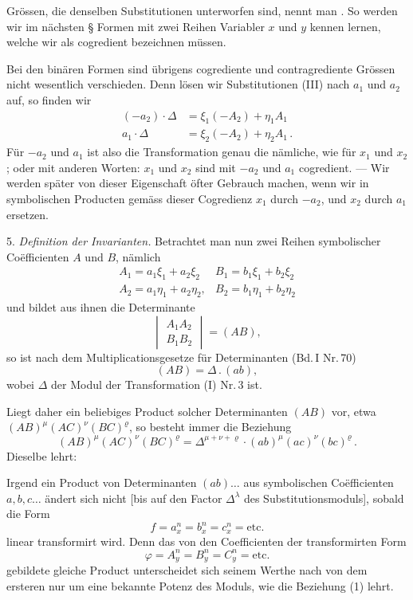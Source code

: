 \documentclass[11pt]{article}
\providecommand{\gesperrt}[1]{\textls[130]{#1}}
\providecommand{\weberpage}[1]{}
\providecommand{\weq}[2]{\begin{equation}\tag{#1}#2\end{equation}}
\let\Delta\varDelta
\begin{document}
Grössen, die denselben Substitutionen unterworfen sind, nennt man \gesperrt{cogrediente Grössen}. So werden wir im nächsten § Formen mit zwei Reihen Variabler $x$ und $y$ kennen lernen, welche wir als cogredient bezeichnen müssen.

Bei den binären Formen sind übrigens cogrediente und contragrediente Grössen nicht wesentlich verschieden. Denn lösen wir Substitutionen (III) nach $a_1$ und $a_2$ auf, so finden wir
\[
\begin{aligned}
(-a_2)\cdot\Delta &= \xi_1(-A_2) + \eta_1A_1 \\
a_1\cdot\Delta &= \xi_2(-A_2) + \eta_2A_1\,.
\end{aligned}
\]
Für $-a_2$ und $a_1$ ist also die Transformation genau die nämliche, wie für $x_1$ und $x_2$; oder mit anderen Worten: $x_1$ und $x_2$ sind mit $-a_2$ und $a_1$ cogredient. — Wir werden später von dieser Eigenschaft öfter Gebrauch machen, wenn wir in symbolischen Producten gemäss dieser Cogredienz $x_1$ durch $-a_2$, und $x_2$ durch $a_1$ ersetzen.


\weberpage{5}
5. \textit{Definition der Invarianten.} Betrachtet man nun zwei Reihen
symbolischer Co\"efficienten $A$ und $B$, nämlich
\[
\begin{array}{ll}
A_1 = a_1\xi_1 + a_2\xi_2 & B_1 = b_1\xi_1+b_2\xi_2\\
A_2 = a_1\eta_1+a_2\eta_2, & B_2 = b_1\eta_1+b_2\eta_2
\end{array}
\]
und bildet aus ihnen die Determinante
\[
\begin{vmatrix} A_1A_2\\ B_1B_2 \end{vmatrix} = (AB),
\]
so ist nach dem Multiplicationsgesetze für Determinanten (Bd.\,I Nr.\,70)
\weq{1}{(AB) = \Delta\,.\,(ab),}
wobei $\Delta$ der Modul der Transformation (I) Nr.\,3 ist.

Liegt daher ein beliebiges Product solcher Determinanten $(AB)$
vor, etwa $(AB)^\mu(AC)^\nu(BC)^\varrho$, so besteht immer die Beziehung
\weq{2}{(AB)^\mu(AC)^\nu(BC)^\varrho = \Delta^{\mu+\nu+\varrho}\cdot(ab)^\mu(ac)^\nu(bc)^\varrho\,.}
Dieselbe lehrt:

\glqq Irgend ein Product von Determinanten $(ab)\ldots$ aus symbolischen
Co\"efficienten $a, b, c\ldots$ ändert sich nicht [bis auf den
Factor $\Delta^\lambda$ des Substitutionsmoduls], sobald die Form
\[
f = a_x^n = b_x^n = c_x^n = \text{etc.}
\]
linear transformirt wird. Denn das von den Coefficienten der
transformirten Form
\[
\varphi = A_y^n = B_y^n = C_y^n = \text{etc.}
\]
gebildete gleiche Product unterscheidet sich seinem Werthe nach
von dem ersteren nur um eine bekannte Potenz des Moduls, wie die
Beziehung (1) lehrt.\grqq{}
\end{document}
